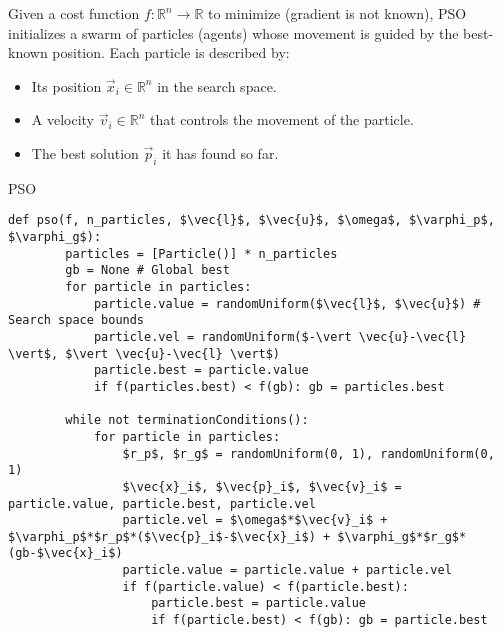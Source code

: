 Given a cost function $f: \mathbb{R}^n \rightarrow \mathbb{R}$ to minimize (gradient is not known),
PSO initializes a swarm of particles (agents) whose movement is guided by the best-known position.
Each particle is described by:
\begin{itemize}
    \item Its position $\vec{x}_i \in \mathbb{R}^n$ in the search space.
    \item A velocity $\vec{v}_i \in \mathbb{R}^n$ that controls the movement of the particle.
    \item The best solution $\vec{p}_i$ it has found so far.
\end{itemize}

\begin{algorithm}
\caption{PSO}
\begin{lstlisting}[mathescape=true]
    def pso(f, n_particles, $\vec{l}$, $\vec{u}$, $\omega$, $\varphi_p$, $\varphi_g$):
        particles = [Particle()] * n_particles
        gb = None # Global best
        for particle in particles:
            particle.value = randomUniform($\vec{l}$, $\vec{u}$) # Search space bounds
            particle.vel = randomUniform($-\vert \vec{u}-\vec{l} \vert$, $\vert \vec{u}-\vec{l} \vert$)
            particle.best = particle.value
            if f(particles.best) < f(gb): gb = particles.best

        while not terminationConditions():
            for particle in particles:
                $r_p$, $r_g$ = randomUniform(0, 1), randomUniform(0, 1)
                $\vec{x}_i$, $\vec{p}_i$, $\vec{v}_i$ = particle.value, particle.best, particle.vel
                particle.vel = $\omega$*$\vec{v}_i$ + $\varphi_p$*$r_p$*($\vec{p}_i$-$\vec{x}_i$) + $\varphi_g$*$r_g$*(gb-$\vec{x}_i$)
                particle.value = particle.value + particle.vel
                if f(particle.value) < f(particle.best):
                    particle.best = particle.value
                    if f(particle.best) < f(gb): gb = particle.best
\end{lstlisting}
\end{algorithm}

